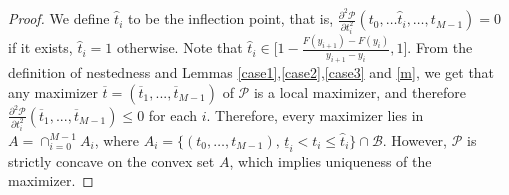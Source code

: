 \documentclass[12pt,reqno]{amsart}
\begin{document}
\begin{proof}
We define $\hat t_i$ to be the inflection point, that is, $\frac{\partial^2\mathcal{P}}{\partial t_i^2}(t_0,\dots \hat t_i,\dots,t_{M-1})=0$ if it exists, $\hat t_i =1$ otherwise.   Note that $\hat{t}_i\in\Big[1-\frac{F(y_{i+1})-F(y_i)}{y_{i+1}-y_i},1\Big].$
From the definition of nestedness and Lemmas \ref{case1},\ref{case2},\ref{case3} and \ref{m}, we get that any maximizer $\overline t= (\overline{t}_1,...,\overline t_{M-1})$ of $\mathcal{P}$ is a local maximizer, and therefore $\frac{\partial^2\mathcal{P}}{\partial t_i^2}(\overline{t}_1,...,\overline t_{M-1}) \leq 0$ for each $i$.  Therefore, every maximizer lies in $A=\cap_{i=0}^{M-1}A_i$, where $A_i=\{(t_0,\dots,t_{M-1}),\, \underline{t}_i<t_i\leq \hat{t}_i\}\cap\mathcal{B}$. However,  $\mathcal{P}$ is strictly concave on the convex set $A$, which implies uniqueness of the maximizer.
\end{proof}

  
  
\end{document}
